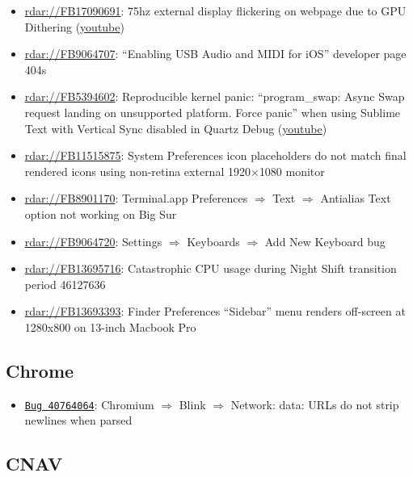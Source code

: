 \documentclass[]{article}
\begin{document}
\begin{itemize}
    \setlength{\parskip}{0pt}  
    \setlength{\itemsep}{0pt}  
    \setlength{\parsep}{0pt}  
    \setlength{\topsep}{0pt} 
    
    \item \url{rdar://FB17090691}: 75hz external display flickering on webpage due to GPU Dithering (\href{https://www.youtube.com/watch?v=hvSKLLxtTEo}{youtube})
    \item \url{rdar://FB9064707}: “Enabling USB Audio and MIDI for iOS” developer page 404s
    \item \url{rdar://FB5394602}: Reproducible kernel panic: “program\_swap: Async Swap request landing on unsupported platform. Force panic'' when using Sublime Text with Vertical Sync disabled in Quartz Debug (\href{https://www.youtube.com/watch?v=zcm0sYtiFxc}{youtube})
    \item \url{rdar://FB11515875}: System Preferences icon placeholders do not match final rendered icons using non-retina external 1920$\times$1080 monitor
    \item \url{rdar://FB8901170}: Terminal.app Preferences $\Rightarrow$ Text $\Rightarrow$ Antialias Text option not working on Big Sur
    \item \url{rdar://FB9064720}: Settings $\Rightarrow$ Keyboards $\Rightarrow$ Add New Keyboard bug
    \item \url{rdar://FB13695716}: Catastrophic CPU usage during Night Shift transition period 46127636
    \item \url{rdar://FB13693393}: Finder Preferences “Sidebar” menu renders off-screen at 1280x800 on 13-inch Macbook Pro
\end{itemize}

\subsection*{Chrome}

\begin{itemize}
	\item \href{https://issues.chromium.org/issues/40764064}{\texttt{Bug 40764064}}: Chromium $\Rightarrow$ Blink $\Rightarrow$ Network: data: URLs do not strip newlines when parsed
\end{itemize}

\subsection*{CNAV}
\end{document}
